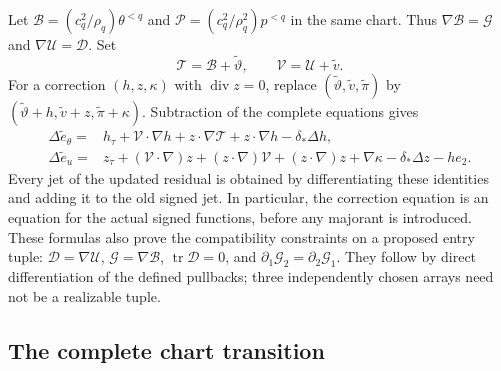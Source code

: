 Let $\mathcal B=(c_q^2/\rho_q)\theta^{<q}$ and
$\mathcal P=(c_q^2/\rho_q^2)p^{<q}$ in the same chart.  Thus
$\nabla\mathcal B=\mathcal G$ and $\nabla\mathcal U=\mathcal D$.
Set
\[
 \mathcal T=\mathcal B+\widetilde\vartheta,\qquad
 \mathcal V=\mathcal U+\widetilde v.
\]
For a correction $(h,z,\kappa)$ with $\operatorname{div}z=0$, replace
$(\widetilde\vartheta,\widetilde v,\widetilde\pi)$ by
$(\widetilde\vartheta+h,\widetilde v+z,\widetilde\pi+\kappa)$.
Subtraction of the complete equations gives
\begin{align}
 \Delta\widetilde e_\theta={}&
 h_\tau+\mathcal V\cdot\nabla h+z\cdot\nabla\mathcal T
 +z\cdot\nabla h-\delta_*\Delta h,
 \label{irc:correction-scalar}\\
 \Delta\widetilde e_u={}&
 z_\tau+(\mathcal V\cdot\nabla)z+(z\cdot\nabla)\mathcal V
 +(z\cdot\nabla)z+\nabla\kappa-\delta_*\Delta z-he_2.
 \label{irc:correction-vector}
\end{align}
Every jet of the updated residual is obtained by differentiating
these identities and adding it to the old signed jet.  In particular,
the correction equation is an equation for the actual signed
functions, before any majorant is introduced.  These formulas also
prove the compatibility constraints on a proposed entry tuple:
$\mathcal D=\nabla\mathcal U$, $\mathcal G=\nabla\mathcal B$,
$\operatorname{tr}\mathcal D=0$, and
$\partial_1\mathcal G_2=\partial_2\mathcal G_1$.
They follow by direct differentiation of the defined pullbacks;
three independently chosen arrays need not be a realizable tuple.

\subsection{The complete chart transition}

